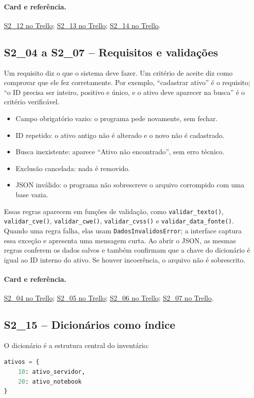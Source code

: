 \documentclass[11pt,a4paper]{article}
\newcommand{\referencia}[2]{\paragraph{Card e referência.}\href{#1}{#2}}
\newcommand{\cardsection}[1]{\Needspace{12\baselineskip}\subsection{#1}}
\begin{document}
\referencia{https://trello.com/c/zzyFLROU}{S2\_12 no Trello}; \href{https://trello.com/c/xMcbgbvn}{S2\_13 no Trello}; \href{https://trello.com/c/XFF3yzHz}{S2\_14 no Trello}.

\cardsection{S2\_04 a S2\_07 -- Requisitos e validações}

Um requisito diz o que o sistema deve fazer. Um critério de aceite diz como comprovar que ele fez corretamente. Por exemplo, ``cadastrar ativo'' é o requisito; ``o ID precisa ser inteiro, positivo e único, e o ativo deve aparecer na busca'' é o critério verificável.

\begin{itemize}
  \item Campo obrigatório vazio: o programa pede novamente, sem fechar.
  \item ID repetido: o ativo antigo não é alterado e o novo não é cadastrado.
  \item Busca inexistente: aparece ``Ativo não encontrado'', sem erro técnico.
  \item Exclusão cancelada: nada é removido.
  \item JSON inválido: o programa não sobrescreve o arquivo corrompido com uma base vazia.
\end{itemize}

Essas regras aparecem em funções de validação, como \texttt{validar\_texto()}, \texttt{validar\_cve()}, \texttt{validar\_cwe()}, \texttt{validar\_cvss()} e \texttt{validar\_data\_fonte()}. Quando uma regra falha, elas usam \texttt{DadosInvalidosError}; a interface captura essa exceção e apresenta uma mensagem curta. Ao abrir o JSON, as mesmas regras conferem os dados salvos e também confirmam que a chave do dicionário é igual ao ID interno do ativo. Se houver incoerência, o arquivo não é sobrescrito.

\referencia{https://trello.com/c/NcSDMJuv}{S2\_04 no Trello}; \href{https://trello.com/c/YSC57Mjy}{S2\_05 no Trello}; \href{https://trello.com/c/5beR1TIT}{S2\_06 no Trello}; \href{https://trello.com/c/Vs045ALu}{S2\_07 no Trello}.

\cardsection{S2\_15 -- Dicionários como índice}

O dicionário é a estrutura central do inventário:

\begin{lstlisting}[language=Python,caption={Estrutura principal na memória}]
ativos = {
    10: ativo_servidor,
    20: ativo_notebook
}
\end{lstlisting}
\end{document}
